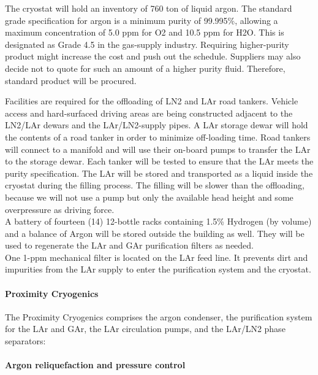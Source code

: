 The cryostat will hold an inventory of 760 ton of liquid argon. The standard grade specification for argon is a minimum purity of 99.995\%, allowing a maximum concentration of 5.0 ppm for O2 and 10.5 ppm for H2O. 
This is designated as Grade 4.5 in the gas-supply industry. Requiring higher-purity product might increase the cost and push out the schedule. Suppliers may also decide not to quote for such an amount of a higher purity fluid. Therefore, standard product will be procured.

Facilities are required for the offloading of LN2 and LAr road tankers. Vehicle access and hard-surfaced driving areas are being constructed adjacent to the LN2/LAr dewars and the LAr/LN2-supply pipes. A LAr storage dewar will hold the contents of a road tanker in order to minimize off-loading time. Road tankers will connect to a manifold and will use their on-board pumps to transfer the LAr to the storage dewar. Each tanker will be tested to ensure that the LAr meets the purity specification. The LAr will be stored and transported as a liquid inside the cryostat during the filling process. The filling will be slower than the offloading, because we will not use a pump but only the available head height and some overpressure as driving force. \\
%
A battery of fourteen (14) 12-bottle racks containing 1.5\% Hydrogen (by volume) and a balance of Argon will be stored outside the building as well. They will be used to regenerate the LAr and GAr purification filters as needed.\\
%
One 1-ppm mechanical filter is located on the LAr feed line. It prevents dirt and impurities from the LAr supply to enter the purification system and the cryostat.

\paragraph{Proximity Cryogenics}

The Proximity Cryogenics comprises the argon condenser, the purification system for the LAr and GAr, the LAr circulation pumps, and the LAr/LN2 phase separators:

\paragraph{Argon reliquefaction and pressure control}

